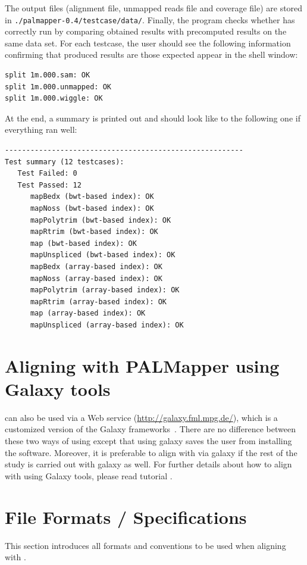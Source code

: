 \documentclass{article}
\begin{document}
\begin{enumerate}
The output files (alignment file, unmapped reads file and coverage
file) are stored in \texttt{./palmapper-0.4/testcase/data/}. Finally,
the program checks whether \PALMapper{} has correctly run by comparing
obtained results with precomputed results on the same data set. For
each testcase, the user should see the following information
confirming that produced results are those expected appear in the
shell window:  

\begin{verbatim}
split 1m.000.sam: OK
split 1m.000.unmapped: OK
split 1m.000.wiggle: OK
\end{verbatim}

At the end, a summary is printed out and should look like to the
following one if everything ran well:

\begin{verbatim}
--------------------------------------------------------
Test summary (12 testcases):
   Test Failed: 0
   Test Passed: 12
      mapBedx (bwt-based index): OK
      mapNoss (bwt-based index): OK
      mapPolytrim (bwt-based index): OK
      mapRtrim (bwt-based index): OK
      map (bwt-based index): OK
      mapUnspliced (bwt-based index): OK
      mapBedx (array-based index): OK
      mapNoss (array-based index): OK
      mapPolytrim (array-based index): OK
      mapRtrim (array-based index): OK
      map (array-based index): OK
      mapUnspliced (array-based index): OK
\end{verbatim}
\end{enumerate}

\section{Aligning with PALMapper using Galaxy tools}
\label{sec:aligninggal}
\PALMapper{} can also be used via a Web service
(\url{http://galaxy.fml.mpg.de/}), which is a customized version of
the Galaxy frameworks~\cite{Galaxy1,Galaxy2,Galaxy3}. There are no
difference between these two ways of using \PALMapper{} except that using
galaxy saves the user from installing the software. Moreover, it is
preferable to align with \PALMapper{} via galaxy if the rest of the study is
carried out with galaxy as well. For further details about how to
align with \PALMapper{} using Galaxy tools, please read \PALMapper{}
tutorial \cite{Palmapper}.



\section{File Formats / Specifications}
\label{sec:formats}
This section introduces all formats and conventions to be used when
aligning with \PALMapper{}.
\end{document}
